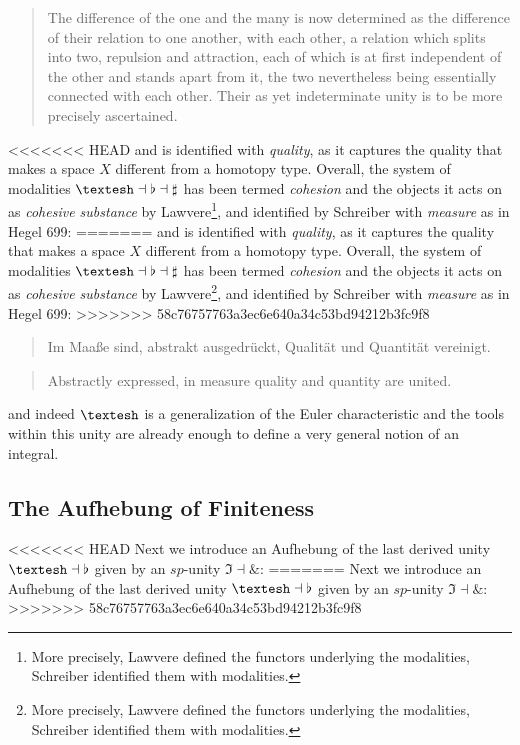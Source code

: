 \documentclass{article}
\begin{document}
\begin{quote}
    The difference of the one and the many is now determined as the difference of their relation to one
another, with each other, a relation which splits into two, repulsion and attraction, each of which is
at first independent of the other and stands apart from it, the two nevertheless being essentially connected
with each other. Their as yet indeterminate unity is to be more precisely ascertained.
\end{quote}

<<<<<<< HEAD
and is identified with \emph{quality}, as it captures the quality that makes a space $X$ different from a
homotopy type. Overall, the system of modalities $\textrm{\textesh}\dashv\flat\dashv\sharp$ has been termed
\emph{cohesion} and the objects it acts on as \emph{cohesive substance} by Lawvere\cite{Coh}\footnote{More
precisely, Lawvere defined the functors underlying the modalities, Schreiber identified them with
modalities.}, and identified by Schreiber with \emph{measure} as in Hegel 699:
=======
and is identified with \emph{quality}, as it captures the quality that makes a space $X$ different from
a homotopy type. Overall, the system of modalities $\textrm{\textesh}\dashv\flat\dashv\sharp$ has been
termed \emph{cohesion} and the objects it acts on as \emph{cohesive substance} by Lawvere\cite{Coh}\footnote{More
precisely, Lawvere defined the functors underlying the modalities, Schreiber identified them with modalities.},
and identified by Schreiber with \emph{measure} as in Hegel 699:
>>>>>>> 58c76757763a3ec6e640a34c53bd94212b3fc9f8

\begin{quote}
    Im Maaße sind, abstrakt ausgedrückt, Qualität und Quantität vereinigt.
\end{quote}

\begin{quote}
    Abstractly expressed, in measure quality and quantity are united.
\end{quote}

and indeed $\textrm{\textesh}$ is a generalization of the Euler characteristic and the tools within this
unity are already enough to define a very general notion of an integral\cite{Nlabintegral}.

\subsection{The Aufhebung of Finiteness}
<<<<<<< HEAD
Next we introduce an Aufhebung of the last derived unity $\textrm{\textesh}\dashv\flat$ given by an
$sp$-unity $ \Im\dashv\&$:
=======
Next we introduce an Aufhebung of the last derived unity $\textrm{\textesh}\dashv\flat$ given by an $sp$-unity
$ \Im\dashv\&$:
>>>>>>> 58c76757763a3ec6e640a34c53bd94212b3fc9f8
\end{document}
